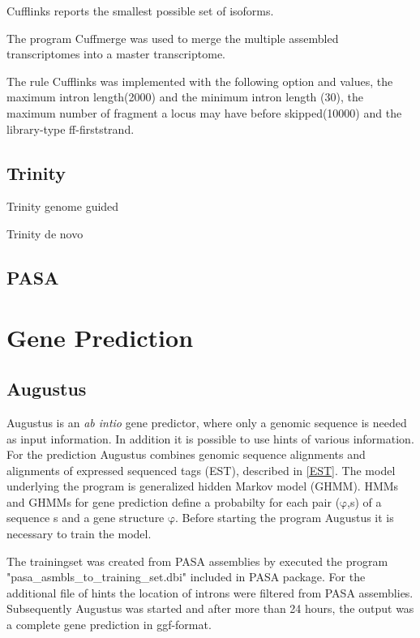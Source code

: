 \documentclass[11pt, a4paper]{report}
\begin{document}
Cufflinks reports the smallest possible set of isoforms. 


The program Cuffmerge was used to merge the multiple assembled transcriptomes into a master transcriptome. 
\cite{Trapnell2010}


The rule Cufflinks was implemented with the following option and values, the maximum intron length(2000) and the minimum intron length (30), the maximum number of fragment a locus may have before skipped(10000) and the library-type ff-firststrand.



\subsection*{Trinity}


\cite{Grabherr2013}

Trinity genome guided

Trinity de novo

\subsection*{PASA}
\section{Gene Prediction}
\subsection*{Augustus}
Augustus is an \textit{ab intio} gene predictor, where only a genomic sequence is needed as input information. In addition it is possible to use hints of various information. For the prediction Augustus combines genomic sequence alignments and alignments of expressed sequenced tags (EST), described in \ref{EST}. The model underlying the program is generalized hidden Markov model (GHMM). HMMs and GHMMs for gene prediction define a probabilty for each pair ($\mathrm{\varphi}$,s) of a sequence s and a gene structure $\mathrm{\varphi}$. Before starting the program Augustus it is necessary to train the model. \cite{Stanke2006} 

The trainingset was created from PASA assemblies by executed the program "pasa\_asmbls\_to\_training\_set.dbi" included in PASA package. For the additional file of hints the location of introns were filtered from PASA assemblies. Subsequently Augustus was started and after more than 24 hours, the output was a complete gene prediction in ggf-format. 
\end{document}
